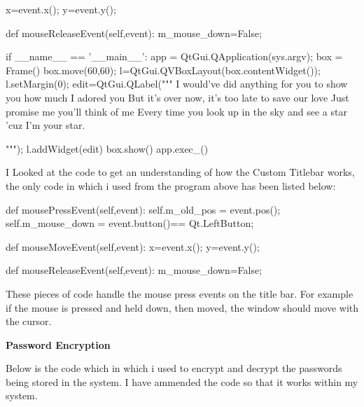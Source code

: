 \begin{python}
        x=event.x();
        y=event.y();

    def mouseReleaseEvent(self,event):
        m_mouse_down=False;




if __name__ == '__main__':
    app = QtGui.QApplication(sys.argv);
    box = Frame()
    box.move(60,60);
    l=QtGui.QVBoxLayout(box.contentWidget());
    l.setMargin(0);
    edit=QtGui.QLabel("""
I would've did anything for you to show you how much I adored you
But it's over now, it's too late to save our love
Just promise me you'll think of me
Every time you look up in the sky and see a star 'cuz I'm  your star.

                          """);
    l.addWidget(edit)
    box.show()
    app.exec_()

\end{python}


I Looked at the code to get an understanding of how the Custom Titlebar works, the only code in which i used from the program above has been listed below:

\begin{python}

def mousePressEvent(self,event):
        self.m_old_pos = event.pos();
        self.m_mouse_down = event.button()== Qt.LeftButton;
   
def mouseMoveEvent(self,event):
        x=event.x();
        y=event.y();
        
def mouseReleaseEvent(self,event):
        m_mouse_down=False;

\end{python}

These pieces of code handle the mouse press events on the title bar. For example if the mouse is pressed and held down, then moved, the window should move with the cursor.

\textbf{Password Encryption}

Below is the code which in which i used to encrypt and decrypt the passwords being stored in the system. I have ammended the code so that it works within my system.

